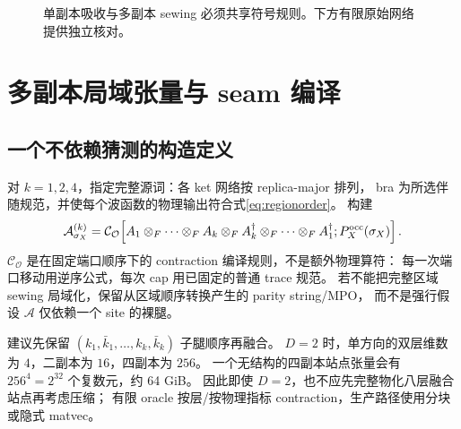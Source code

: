 \documentclass[11pt]{article}
\begin{document}
\begin{figure}[ht]
\centering
{}
\caption{单副本吸收与多副本 sewing 必须共享符号规则。下方有限原始网络提供独立核对。}
\end{figure}

\section{多副本局域张量与 seam 编译}
\subsection{一个不依赖猜测的构造定义}

对 $k=1,2,4$，指定完整源词：各 ket 网络按 replica-major 排列，
bra 为所选伴随规范，并使每个波函数的物理输出符合式\eqref{eq:regionorder}。
构建
\begin{equation}
 \mathcal A^{(k)}_{\sigma_X}
 =\mathcal C_{\mathcal O}\!\left[
    A_1\otimes_F\cdots\otimes_F A_k
    \otimes_F A_k^\dagger\otimes_F\cdots\otimes_F A_1^\dagger;
    P_X^{\rm occ}(\sigma_X)\right].\label{eq:replicatile}
\end{equation}
$\mathcal C_{\mathcal O}$ 是在固定端口顺序下的 contraction 编译规则，不是额外物理算符：
每一次端口移动用逆序公式，每次 cap 用已固定的普通 trace 规范。
若不能把完整区域 sewing 局域化，保留从区域顺序转换产生的 parity string/MPO，
而不是强行假设 $\mathcal A$ 仅依赖一个 site 的裸腿。

建议先保留 $(k_1,\bar k_1,\ldots,k_k,\bar k_k)$ 子腿顺序再融合。
$D=2$ 时，单方向的双层维数为 $4$，二副本为 $16$，四副本为 $256$。
一个无结构的四副本站点张量会有 $256^4=2^{32}$ 个复数元，约 64 GiB。
因此即使 $D=2$，也不应先完整物化八层融合站点再考虑压缩；
有限 oracle 按层/按物理指标 contraction，生产路径使用分块或隐式 matvec。
\end{document}
